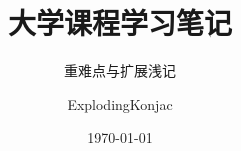 \documentclass{note}
\title{大学课程学习笔记}
\subtitle{重难点与扩展浅记}
\author{ExplodingKonjac}
\date{\today}
\begin{document}
\begin{titlingpage}
	\maketitle
\end{titlingpage}

\tableofcontents
















\end{document}
